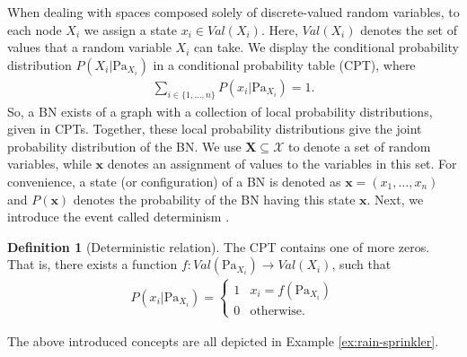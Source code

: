 \documentclass[a4paper, twoside, 11pt]{report}
\theoremstyle{plain}
\theoremstyle{definition}
\newtheorem{definition}[thm]{Definition}
\theoremstyle{remark}
\newcommand{\X}{{\mathcal{X}}}
\newcommand{\bfx}{{\mathbf{x}}}
\newcommand{\bfX}{{\mathbf{X}}}
\begin{document}
When dealing with spaces composed solely of discrete-valued random variables, to each node $X_i$ we assign a state $x_i \in Val(X_i)$. Here, $Val(X_i)$ denotes the set of values that a random variable $X_i$ can take. We display the conditional probability distribution $P(X_i | \text{Pa}_{X_i})$ in a conditional probability table (CPT), where
\begin{align*}
\sum_{i \in \{1, \ldots , n\}} P(x_i | \text{Pa}_{X_i}) = 1.
\end{align*}
So, a BN exists of a graph with a collection of local probability distributions, given in CPTs. Together, these local probability distributions give the joint probability distribution of the BN. We use $\bfX \subseteq \X$ to denote a set of random variables, while $\bfx$ denotes an assignment of values to the variables in this set. For convenience, a state (or configuration) of a BN is denoted as $\bfx = (x_1, \ldots , x_n)$ and $P(\bfx)$ denotes the probability of the BN having this state $\bfx$. Next, we introduce the event called determinism \citep[p.~158]{koller2009probabilistic}.
\begin{definition}[Deterministic relation]
The CPT contains one of more zeros. That is, there exists a function $f: Val(\text{Pa}_{X_i}) \to Val(X_i)$, such that
\begin{align*}
P(x_i | \text{Pa}_{X_i}) =
\begin{cases}
1 & x_i = f(\text{Pa}_{X_i}) \\ 
0 & \text{otherwise}.
\end{cases}
\end{align*} 
\end{definition}
The above introduced concepts are all depicted in Example \ref{ex:rain-sprinkler}.
\end{document}
